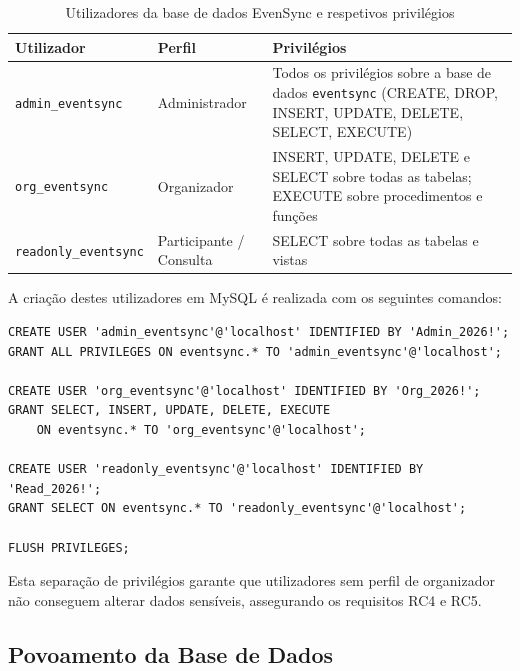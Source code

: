 \documentclass[runningheads]{llncs}
\begin{document}
                \begin{table}[H]
                \centering
                \begin{tabular}{|l|l|p{}|}
                \hline
                \textbf{Utilizador} & \textbf{Perfil} & \textbf{Privilégios} \\ \hline
                \texttt{admin\_eventsync} & Administrador & Todos os privilégios sobre a base de dados \texttt{eventsync} (CREATE, DROP, INSERT, UPDATE, DELETE, SELECT, EXECUTE) \\ \hline
                \texttt{org\_eventsync}   & Organizador   & INSERT, UPDATE, DELETE e SELECT sobre todas as tabelas; EXECUTE sobre procedimentos e funções \\ \hline
                \texttt{readonly\_eventsync} & Participante / Consulta & SELECT sobre todas as tabelas e vistas \\ \hline
                \end{tabular}
                \vspace{0.2cm}
                \caption{Utilizadores da base de dados EvenSync e respetivos privilégios} \label{tab:utilizadores}
                \end{table}

                A criação destes utilizadores em MySQL é realizada com os seguintes comandos:

                \begin{verbatim}
CREATE USER 'admin_eventsync'@'localhost' IDENTIFIED BY 'Admin_2026!';
GRANT ALL PRIVILEGES ON eventsync.* TO 'admin_eventsync'@'localhost';

CREATE USER 'org_eventsync'@'localhost' IDENTIFIED BY 'Org_2026!';
GRANT SELECT, INSERT, UPDATE, DELETE, EXECUTE
    ON eventsync.* TO 'org_eventsync'@'localhost';

CREATE USER 'readonly_eventsync'@'localhost' IDENTIFIED BY 'Read_2026!';
GRANT SELECT ON eventsync.* TO 'readonly_eventsync'@'localhost';

FLUSH PRIVILEGES;
                \end{verbatim}

                Esta separação de privilégios garante que utilizadores sem perfil de organizador não conseguem alterar dados sensíveis, assegurando os requisitos RC4 e RC5.

                \subsection{Povoamento da Base de Dados}
\end{document}
